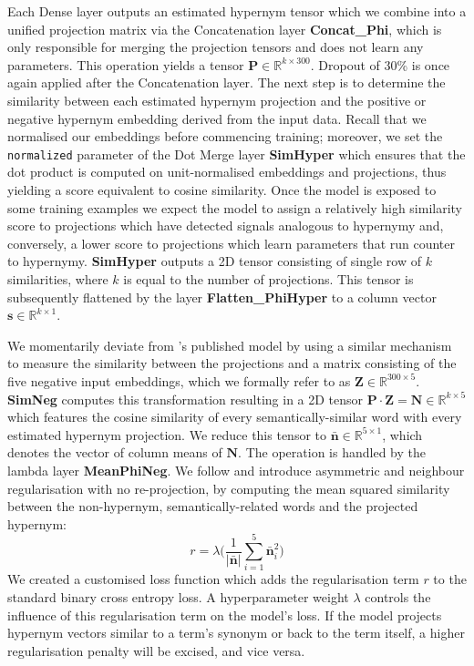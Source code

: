 Each Dense layer outputs an estimated hypernym tensor which we combine into a unified projection matrix via the Concatenation layer \textbf{Concat\_Phi}, which is only responsible for merging the projection tensors and does not learn any parameters.  This operation yields a tensor $\bm{P} \in \mathbb{R}^{k\times300}$.  Dropout of 30\% is once again applied after the Concatenation layer.  The next step is to determine the similarity between each estimated hypernym projection and the positive or negative hypernym embedding derived from the input data.  Recall that we normalised our embeddings before commencing training; moreover, we set the \texttt{normalized} parameter of the Dot Merge layer \textbf{SimHyper} which ensures that the dot product is computed on unit-normalised embeddings and projections, thus yielding a score equivalent to cosine similarity.  Once the model is exposed to some training examples we expect the model to assign a relatively high similarity score to projections which have detected signals analogous to hypernymy and, conversely, a lower score to projections which learn parameters that run counter to hypernymy.  \textbf{SimHyper} outputs a 2D tensor consisting of single row of $k$ similarities, where $k$ is equal to the number of projections. This tensor is subsequently flattened by the layer \textbf{Flatten\_PhiHyper} to a column vector $\bm{s} \in \mathbb{R}^{k\times1}$.

We momentarily deviate from \citeauthor{bernier2018crim}'s published model by using a similar mechanism to measure the similarity between the projections and a matrix consisting of the  five negative input embeddings, which we formally refer to as $\bm{Z} \in \mathbb{R}^{300\times5}$.  \textbf{SimNeg} computes this transformation resulting in a 2D tensor $\bm{P}\cdot\bm{Z} = \bm{N} \in \mathbb{R}^{k\times5}$ which features the cosine similarity of every semantically-similar word with every estimated hypernym projection.  We reduce this tensor to $\bm{\bar{n}} \in \mathbb{R}^{5\times1}$, which denotes the vector of column means of $\bm{N}$. The operation is handled by the lambda layer \textbf{MeanPhiNeg}. We follow \citep{ustalov2017negative} and introduce asymmetric and neighbour regularisation with no re-projection, by computing the mean squared similarity between the non-hypernym, semantically-related words and the projected hypernym:
\[ r = \lambda \bigg( \frac{1}{\vert \bm{\bar{n}} \vert}\sum_{i=1}^{5} \bm{\bar{n}}_i^2 \bigg)\]
We created a customised loss function which adds the regularisation term $r$ to the standard binary cross entropy loss.  A hyperparameter weight $\lambda$ controls the influence of this regularisation term on the model's loss.  If the model projects hypernym vectors similar to a term's synonym or back to the term itself, a higher regularisation penalty will be excised, and vice versa.

